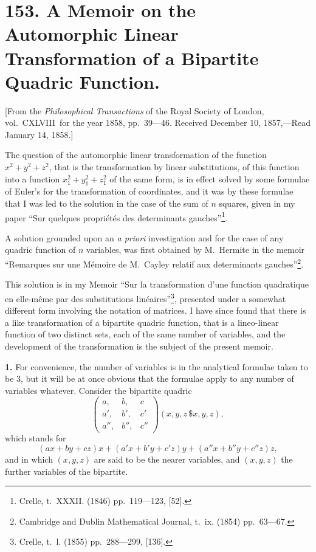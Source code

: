 \documentclass[12pt,a4paper]{article}
\theoremstyle{definition}
\begin{document}
\newpage

\section*{153. A Memoir on the Automorphic Linear Transformation of a Bipartite Quadric Function.}

[From the \textit{Philosophical Transactions} of the Royal Society of London, vol.~CXLVIII\ for the year 1858, pp.~39---46.
Received December 10, 1857,---Read January 14, 1858.]

\bigskip

The question of the automorphic linear transformation of the function $x^2+y^2+z^2$, that is the transformation by linear substitutions, of this function into a function $x_1^2+y_1^2+z_1^2$ of the same form, is in effect solved by some formulae of Euler's for the transformation of coordinates, and it was by these formulae that I was led to the solution in the case of the sum of $n$ squares, given in my paper ``Sur quelques propri\'et\'es des determinants gauches''\footnote{Crelle, t.~XXXII. (1846) pp.~119---123, [52].}.

A solution grounded upon an \textit{a priori} investigation and for the case of any quadric function of $n$ variables, was first obtained by M.~Hermite in the memoir ``Remarques sur une M\'emoire de M.~Cayley relatif aux determinants gauches''\footnote{Cambridge and Dublin Mathematical Journal, t.~ix. (1854) pp.~63---67.}.

This solution is in my Memoir ``Sur la transformation d'une function quadratique en elle-m\^eme par des substitutions lin\'eaires''\footnote{Crelle, t.~l. (1855) pp.~288---299, [136].}, presented under a somewhat different form involving the notation of matrices. I have since found that there is a like transformation of a bipartite quadric function, that is a lineo-linear function of two distinct sets, each of the same number of variables, and the development of the transformation is the subject of the present memoir.

\medskip
\noindent\textbf{1.} For convenience, the number of variables is in the analytical formulae taken to be 3, but it will be at once obvious that the formulae apply to any number of variables whatever. Consider the bipartite quadric
\[
\begin{pmatrix} a, & b, & c \\ a', & b', & c' \\ a'', & b'', & c'' \end{pmatrix}(x,y,z\,\$x,y,z),
\]
which stands for
\[(ax+by+cz)x + (a'x+b'y+c'z)y + (a''x+b''y+c''z)z,\]
and in which $(x,y,z)$ are said to be the nearer variables, and $(x,y,z)$ the further variables of the bipartite.
\end{document}

